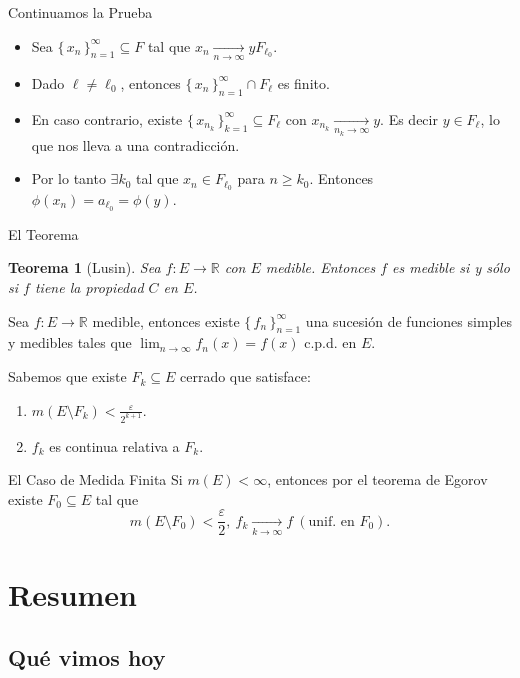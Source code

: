 \documentclass[utf8]{beamer}
\theoremstyle{plain}
\newtheorem{Th}{Teorema}               %
\theoremstyle{definition}
\theoremstyle{remark}
\numberwithin{equation}{section}
\newcommand{\eps}{\varepsilon}          %
\newcommand{\bR}{\mathbb{R}}    %
\newcommand{\set}[1]{\{\,#1\,\}}    %
\renewcommand{\geq}{\geqslant}          %
\renewcommand{\l}{\ell}                   %
\newcommand{\less}{\setminus}           %
\newcommand{\suck}{_{k=1}^\infty} %
\newcommand{\sucn}{_{n=1}^\infty} %
\renewcommand{\.}{\Cdot}                %
\begin{document}
\begin{frame}{Continuamos la Prueba}
  \begin{itemize}
  \item Sea $\set{x_n}\sucn\subseteq F$ tal que $x_n\xrightarrow[n\to\infty]{}y F_{\l_0}$.
  \item Dado $\l\neq \l_0$, entonces $\set{x_n}\sucn\cap F_\l$ es finito.
  \item En caso contrario, existe $\set{x_{n_k}}\suck\subseteq F_\l$ con $x_{n_k}\xrightarrow[n_k\to\infty]{}y$. Es decir $y\in F_\l$, lo que nos lleva a una contradicción.
  \item Por lo tanto $\exists k_0$ tal que $x_n\in F_{\l_0}$ para $n\geq k_0$. Entonces $\phi(x_n)=a_{\l_0}=\phi(y)$.
\end{itemize}
\end{frame}

\begin{frame}{El Teorema}
  \begin{Th}[Lusin]\label{th:Lusin}
    Sea $f:E\to\bR$ con $E$ medible. Entonces $f$ es medible si y sólo si $f$ tiene la propiedad $C$ en $E$.
  \end{Th}
  Sea $f:E\to\bR$ medible, entonces existe $\set{f_n}\sucn$ una sucesión de funciones simples y medibles tales que $\lim_{n\to\infty}f_n(x)=f(x)$ c.p.d. en $E$.\par 
  Sabemos que existe $F_k\subseteq E$ cerrado que satisface:
  \begin{enumerate}
    \item $m(E\less F_k)<\frac{\eps}{2^{k+1}}$.
    \item $f_k$ es continua relativa a $F_k$.  
  \end{enumerate}
\end{frame}

\begin{frame}{El Caso de Medida Finita}
  Si $m(E)<\infty$, entonces por el teorema de Egorov existe $F_0\subseteq E$ tal que 
  $$m(E\less F_0)<\frac{\eps}{2},\ f_k\xrightarrow[k\to\infty]{}f\ (\text{unif. en }F_0).$$
\end{frame}
\section*{Resumen}

\subsection*{Qu\'e vimos hoy}
\end{document}
